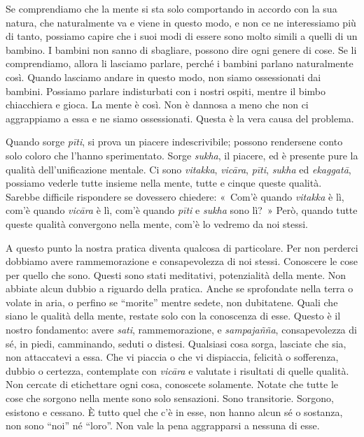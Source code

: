 Se comprendiamo che la mente si sta solo comportando in accordo con la
sua natura, che naturalmente va e viene in questo modo, e non ce ne
interessiamo più di tanto, possiamo capire che i suoi modi di essere
sono molto simili a quelli di un bambino. I bambini non sanno di
sbagliare, possono dire ogni genere di cose. Se li comprendiamo, allora
li lasciamo parlare, perché i bambini parlano naturalmente così. Quando
lasciamo andare in questo modo, non siamo ossessionati dai bambini.
Possiamo parlare indisturbati con i nostri ospiti, mentre il bimbo
chiacchiera e gioca. La mente è così. Non è dannosa a meno che non ci
aggrappiamo a essa e ne siamo ossessionati. Questa è la vera causa del
problema.

Quando sorge \emph{pīti}, si prova un piacere indescrivibile; possono
rendersene conto solo coloro che l'hanno sperimentato. Sorge
\emph{sukha}, il piacere, ed è presente pure la qualità
dell'unificazione mentale. Ci sono \emph{vitakka}, \emph{vicāra},
\emph{pīti}, \emph{sukha} ed \emph{ekaggatā}, possiamo vederle tutte
insieme nella mente, tutte e cinque queste qualità. Sarebbe difficile
rispondere se dovessero chiedere: «~Com'è quando \emph{vitakka} è lì,
com'è quando \emph{vicāra} è lì, com'è quando \emph{pīti} e \emph{sukha}
sono lì?~» Però, quando tutte queste qualità convergono nella mente,
com'è lo vedremo da noi stessi.

A questo punto la nostra pratica diventa qualcosa di particolare. Per
non perderci dobbiamo avere rammemorazione e consapevolezza di noi
stessi. Conoscere le cose per quello che sono. Questi sono stati
meditativi, potenzialità della mente. Non abbiate alcun dubbio a
riguardo della pratica. Anche se sprofondate nella terra o volate in
aria, o perfino se ``morite'' mentre sedete, non dubitatene. Quali che
siano le qualità della mente, restate solo con la conoscenza di esse.
Questo è il nostro fondamento: avere \emph{sati}, rammemorazione, e
\emph{sampajañña}, consapevolezza di sé, in piedi, camminando, seduti o
distesi. Qualsiasi cosa sorga, lasciate che sia, non attaccatevi a essa.
Che vi piaccia o che vi dispiaccia, felicità o sofferenza, dubbio o
certezza, contemplate con \emph{vicāra} e valutate i risultati di quelle
qualità. Non cercate di etichettare ogni cosa, conoscete solamente.
Notate che tutte le cose che sorgono nella mente sono solo sensazioni.
Sono transitorie. Sorgono, esistono e cessano. È tutto quel che c'è in
esse, non hanno alcun sé o sostanza, non sono ``noi'' né ``loro''. Non
vale la pena aggrapparsi a nessuna di esse.

